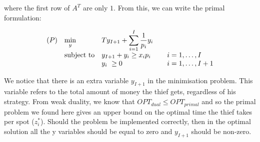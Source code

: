 \documentclass[10pt]{article}
\newenvironment{exercise}[2][Exercise]{\begin{trivlist}
  \item[\hskip \labelsep {\bfseries #1}\hskip \labelsep {\bfseries #2.}]}{\end{trivlist}}
\begin{document}
\begin{exercise}{5.4}
where the first row of $A^T$ are only $1$. From this, we can write the primal formulation:

\begin{equation}
\begin{array}{lll@{}lll}
(P) &\displaystyle\min_{y}\ &&Ty_{I+1} + \displaystyle\sum\limits_{i=1}^{I} \frac{1}{p_i}y_i\\

&\text{subject to} 
&& y_{I+1} + y_{i}\geq x_ip_i  &&  i=1 ,\dots, I\\
&&& y_i\ \geq 0 && i=1 ,\dots, I+1\\ 

\end{array}
\end{equation}

We notice that there is an extra variable $y_{I+1}$ in the minimisation problem. This variable refers to the total amount of money the thief gets, regardless of his strategy.
From weak duality, we know that $OPT_{dual}\leq OPT_{primal}$ and so the primal problem we found here gives an upper bound on the optimal time the thief takes per spot ($z_i^*$). Should the problem be implemented correctly, then in the optimal solution all the y variables should be equal to zero and $y_{I+1}$ should be non-zero.\\




\end{exercise}
\end{document}
